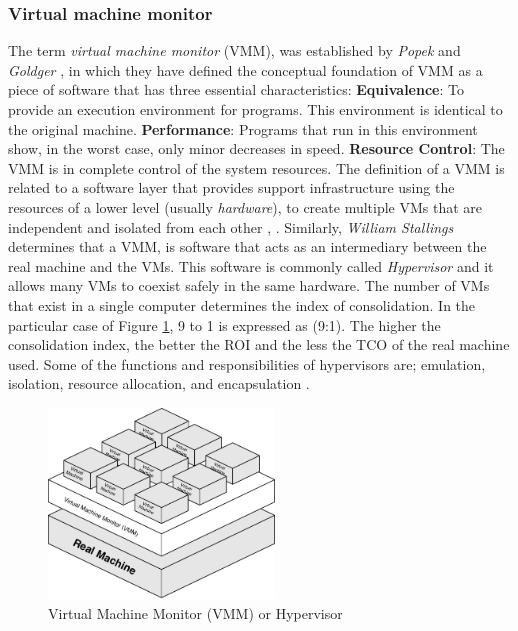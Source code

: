 	\subsubsection{Virtual machine monitor}
	
	The term \textit{virtual machine monitor} (VMM), was established by \textit{Popek} and \textit{Goldger} \cite{Popek1974}, in which they have defined the conceptual foundation of VMM as a piece of software that has three essential characteristics: \textbf{Equivalence}: To provide an execution environment for programs. This environment is identical to the original machine. \textbf{Performance}: Programs that run in this environment show, in the worst case, only minor decreases in speed. \textbf{Resource Control}: The VMM is in complete control of the system resources. The definition of a VMM is related to a software layer that provides support infrastructure using the resources of a lower level (usually \textit{hardware}), to create multiple VMs that are independent and isolated from each other \cite{Chiueh2005}, \cite{Cafaro2011}. Similarly, \textit{William Stallings} \cite{Stallings2015} determines that a VMM, is software that acts as an intermediary between the real machine and the VMs. 
	This software is commonly called \textit{Hypervisor} and it allows many VMs to coexist safely in the same hardware. The number of VMs that exist in a single computer determines the index of consolidation. In the particular case of Figure \ref{fig:VMM}, 9 to 1 is expressed as (9:1). The higher the consolidation index, the better the ROI and the less the TCO of the real machine used. Some of the functions and responsibilities of hypervisors are; emulation, isolation, resource allocation, and encapsulation \cite{Hoopes2009}.


    \begin{figure}[H]
        \centering
        \includegraphics[width=6cm]{images/VMM.pdf}
        \vspace{0.2mm}
        \caption{Virtual Machine Monitor (VMM) or Hypervisor}
        \label{fig:VMM}
    \end{figure}

